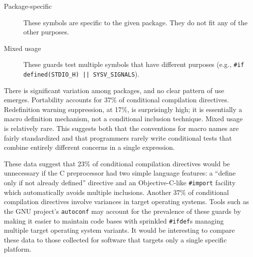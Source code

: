 \documentclass[10pt]{article}
\newcommand{\ppd}[1]{\texttt{\##1}}
\begin{document}
\begin{description}
\item[Package-specific] 
  These symbols are specific to the given package.  They do not fit any of
  the other purposes.

\item[Mixed usage] These guards test multiple symbols
  that have different purposes (e.g., {\tt \#if defined(\verb|STDIO_H|) ||
  \verb|SYSV_SIGNALS|}).

\end{description}



There is significant variation among packages, and no clear pattern of use
emerges.  Portability accounts for 37\% of conditional compilation
directives.  Redefinition warning suppression, at 17\%, is surprisingly
high; it is essentially a macro definition mechanism, not a conditional
inclusion technique.  Mixed usage is relatively rare.  This suggests both
that the conventions for macro names are fairly standardized and that
programmers rarely write conditional tests that combine entirely different
concerns in a single expression.


These data suggest that 23\% of conditional compilation directives
would be unnecessary if the C preprocessor had two simple language
features: a ``define only if not already defined'' directive and 
an Objective-C-like \ppd{import} facility which automatically avoids
multiple inclusions.  Another 37\% of conditional compilation directives
involve variances in target operating
systems.  Tools such as the GNU project's \texttt{autoconf} may account
for the prevalence of these guards by making it easier to maintain code
bases with sprinkled \ppd{ifdef}s managing multiple target operating
system variants.  It would be interesting to compare these data to those
collected for software that targets only a single specific platform.
\end{document}
